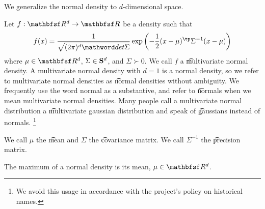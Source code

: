 

We generalize the normal density
to $d$-dimensional space.


Let $f: \R ^d \to \R $ be a density such that $$f(x) = \mgaussiandensity{x}{\mu }{\Sigma }$$ where $\mu  \in \R ^d$, $\Sigma  \in \mathbf{S}^{d}$, and $\Sigma  \succ 0$.
We call $f$ a \t{multivariate normal density}.
A multivariate normal density with $d = 1$ is a normal density, so we refer to multivariate normal densities as \t{normal densities} without ambiguity.
We frequently use the word normal as a substantive, and refer to \t{normals} when we mean multivariate normal densities.
Many people call a multivariate normal distribution a \t{multivariate gaussian distribution} and speak of \t{gaussians} instead of normals.
  \ifhmode\unskip\fi\footnote{
We avoid this usage in accordance with the project's policy on historical names.
  }

We call $\mu $ the \t{mean} and $\Sigma $ the \t{covariance matrix}.
We call $\Sigma ^{-1}$ the \t{precision matrix}.


The maximum of a normal density is its mean, $\mu  \in \R ^d$.

\blankpage

